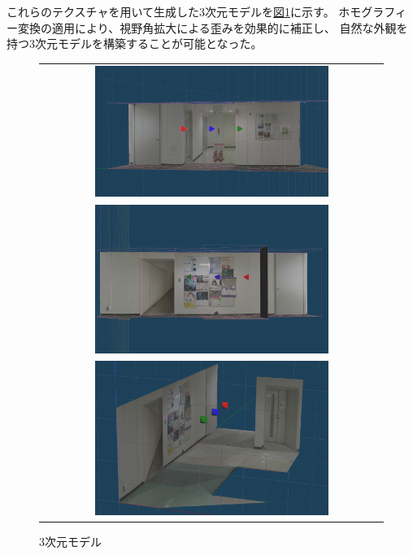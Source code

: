 \documentclass[]{jarticle}          %
\begin{document}
これらのテクスチャを用いて生成した3次元モデルを\hyperref[three]{図\ref{three}}に示す。
ホモグラフィー変換の適用により、視野角拡大による歪みを効果的に補正し、
自然な外観を持つ3次元モデルを構築することが可能となった。

\begin{figure}[H]
  \begin{center}
    \begin{tabular}{c}
      \includegraphics[width=0.7\textwidth]{figures/2.png}\\
      \includegraphics[width=0.7\textwidth]{figures/3.png}\\
      \includegraphics[width=0.7\textwidth]{figures/4.png}\\
    \end{tabular}
  \end{center}
  \caption{3次元モデル}
  \label{three}
\end{figure}
\end{document}
